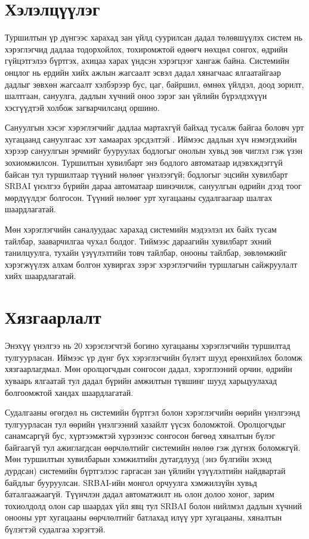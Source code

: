 \section{Хэлэлцүүлэг}

Туршилтын үр дүнгээс харахад зан үйлд суурилсан дадал төлөвшүүлэх систем нь хэрэглэгчид дадлаа тодорхойлох, тохиромжтой өдөөгч нөхцөл сонгох, өдрийн гүйцэтгэлээ бүртгэх, ахицаа харах үндсэн хэрэгцээг хангаж байна. Системийн онцлог нь ердийн хийх ажлын жагсаалт эсвэл дадал хянагчаас ялгаатайгаар дадлыг зөвхөн жагсаалт хэлбэрээр бус, цаг, байршил, өмнөх үйлдэл, доод зорилт, шалтгаан, сануулга, дадлын хүчний оноо зэрэг зан үйлийн бүрэлдэхүүн хэсгүүдтэй холбож загварчилсанд оршино.

Сануулгын хэсэг хэрэглэгчийг дадлаа мартахгүй байхад тусалж байгаа боловч урт хугацаанд сануулгаас хэт хамаарах эрсдэлтэй \cite{ref5}. Иймээс дадлын хүч нэмэгдэхийн хэрээр сануулгын эрчмийг бууруулах бодлогыг онолын хувьд зөв чиглэл гэж үзэн зохиомжилсон. Туршилтын хувилбарт энэ бодлого автоматаар идэвхждэггүй байсан тул туршилтаар түүний нөлөөг үнэлээгүй; бодлогыг эцсийн хувилбарт SRBAI үнэлгээ бүрийн дараа автоматаар шинэчилж, сануулгын өдрийн дээд тоог мөрдүүлдэг болгосон. Түүний нөлөөг урт хугацааны судалгаагаар шалгах шаардлагатай.

Мөн хэрэглэгчийн саналуудаас харахад системийн мэдээлэл их байх тусам тайлбар, зааварчилгаа чухал болдог. Тиймээс дараагийн хувилбарт эхний танилцуулга, тухайн үзүүлэлтийн товч тайлбар, онооны тайлбар, зөвлөмжийг хэрэгжүүлэх алхам болгон хувиргах зэрэг хэрэглэгчийн туршлагын сайжруулалт хийх шаардлагатай.

\section{Хязгаарлалт}

Энэхүү үнэлгээ нь 20 хэрэглэгчтэй богино хугацааны хэрэглэгчийн туршилтад тулгуурласан. Иймээс үр дүнг бүх хэрэглэгчийн бүлэгт шууд ерөнхийлөх боломж хязгаарлагдмал. Мөн оролцогчдын сонгосон дадал, хэрэглээний орчин, өдрийн хуваарь ялгаатай тул дадал бүрийн амжилтын түвшинг шууд харьцуулахад болгоомжтой хандах шаардлагатай.

Судалгааны өгөгдөл нь системийн бүртгэл болон хэрэглэгчийн өөрийн үнэлгээнд тулгуурласан тул өөрийн үнэлгээний хазайлт үүсэх боломжтой. Оролцогчдыг санамсаргүй бус, хүртээмжтэй хүрээнээс сонгосон бөгөөд хяналтын бүлэг байгаагүй тул ажиглагдсан өөрчлөлтийг системийн нөлөө гэж дүгнэх боломжгүй. Мөн туршилтын хувилбарын хэмжилтийн дутагдлууд (энэ бүлгийн эхэнд дурдсан) системийн бүртгэлээс гаргасан зан үйлийн үзүүлэлтийн найдвартай байдлыг бууруулсан. SRBAI-ийн монгол орчуулга хэмжилзүйн хувьд баталгаажаагүй. Түүнчлэн дадал автоматжилт нь олон долоо хоног, зарим тохиолдолд олон сар шаардах үйл явц \cite{ref6} тул SRBAI болон нийлмэл дадлын хүчний онооны урт хугацааны өөрчлөлтийг батлахад илүү урт хугацааны, хяналтын бүлэгтэй судалгаа хэрэгтэй.

